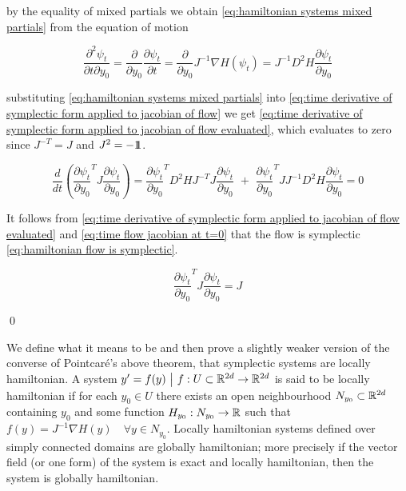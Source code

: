 \documentclass[12pt]{article}
\begin{document}
by the equality of mixed partials we obtain \eqref{eq:hamiltonian systems mixed partials} from the equation of motion

\begin{equation}\label{eq:hamiltonian systems mixed partials}
	\frac{\partial^2 \psi_t}{\partial t\partial y_0} = \frac{\partial }{\partial y_0} \frac{\partial \psi_t}{\partial t} = \frac{\partial}{\partial y_0} J^{-1}\nabla H(\psi_t) = J^{-1} D^2H \frac{\partial \psi_t}{\partial y_0}
\end{equation}

substituting \eqref{eq:hamiltonian systems mixed partials} into \eqref{eq:time derivative of symplectic form applied to jacobian of flow} we get \eqref{eq:time derivative of symplectic form applied to jacobian of flow evaluated}, which evaluates to zero since $J^{-T} = J$ and $J^2 = -1\!\!1$.

\begin{equation}\label{eq:time derivative of symplectic form applied to jacobian of flow evaluated}
    \frac{d}{dt}\left( \frac{\partial \psi_t}{\partial y_0}^T J \frac{\partial \psi_t}{\partial y_0} \right) = 
    \frac{\partial \psi_t}{\partial y_0}^T D^2H J^{-T} J \frac{\partial \psi_t}{\partial y_0} \,\,+\,\, 
    \frac{\partial \psi_t}{\partial y_0}^T J J^{-1} D^2H \frac{\partial \psi_t}{\partial y_0} = 0
\end{equation}

It follows from \eqref{eq:time derivative of symplectic form applied to jacobian of flow evaluated} and \eqref{eq:time flow jacobian at t=0} that the flow is symplectic \eqref{eq:hamiltonian flow is symplectic}.

\begin{equation}\label{eq:hamiltonian flow is symplectic}
    \frac{\partial \psi_t}{\partial y_0}^T J \frac{\partial \psi_t}{\partial y_0} = J
\end{equation}

\qed

We define what it means to be  and then prove a slightly weaker version of the converse of Pointcar\'e's above theorem, that symplectic systems are locally hamiltonian. A system $y' = f(y) \,\,\big|\,\, f : U\subset\mathbb{R}^{2d} \to \mathbb{R}^{2d}$ is said to be locally hamiltonian if for each $y_0\in U$ there exists an open neighbourhood $N_{y_0}\subset \mathbb{R}^{2d}$ containing $y_0$ and some function $H_{y_0} : N_{y_0}\to \mathbb{R}$ such that $f(y) = J^{-1}\nabla H(y)\quad\forall y\in N_{y_0}$. Locally hamiltonian systems defined over simply connected domains are globally hamiltonian; more precisely if the vector field (or one form) of the system is exact and locally hamiltonian, then the  system is globally hamiltonian. 
\end{document}
